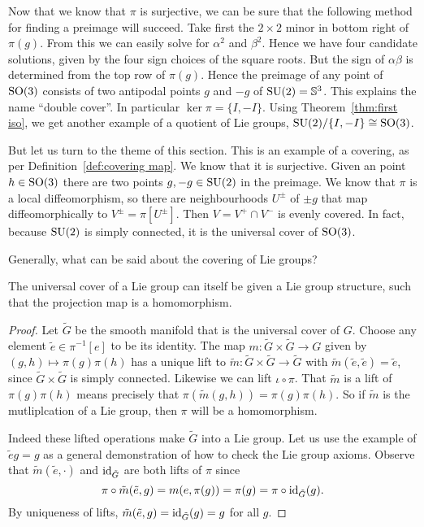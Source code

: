 Now that we know that $\pi$ is surjective, we can be sure that the following method for finding a preimage will succeed.
Take first the $2\times2$ minor in bottom right of $\pi(g)$.
From this we can easily solve for $\alpha^2$ and $\beta^2$.
Hence we have four candidate solutions, given by the four sign choices of the square roots.
But the sign of $\alpha\beta$ is determined from the top row of $\pi(g)$.
Hence the preimage of any point of $\mathrm{SO}(3)$ consists of two antipodal points $g$ and $-g$ of $\mathrm{SU}(2) = \mathbb{S}^3$.
This explains the name ``double cover''.
In particular $\ker \pi = \{I, -I\}$.
Using Theorem~\ref{thm:first iso}, we get another example of a quotient of Lie groups, $\mathrm{SU}(2)/\{I, -I\} \cong \mathrm{SO}(3)$.

But let us turn to the theme of this section. 
This is an example of a covering, as per Definition~\ref{def:covering map}.
We know that it is surjective.
Given an point $h \in \mathrm{SO}(3)$ there are two points $g,-g \in \mathrm{SU}(2)$ in the preimage.
We know that $\pi$ is a local diffeomorphism, so there are neighbourhoods $U^\pm$ of $\pm g$ that map diffeomorphically to $V^\pm = \pi[U^\pm]$.
Then $V = V^+ \cap V^-$ is evenly covered.
In fact, because $\mathrm{SU}(2)$ is simply connected, it is the universal cover of $\mathrm{SO}(3)$.

Generally, what can be said about the covering of Lie groups?
\begin{theorem}
The universal cover of a Lie group can itself be given a Lie group structure, such that the projection map is a homomorphism.
\end{theorem}
\begin{proof}
Let $\tilde{G}$ be the smooth manifold that is the universal cover of $G$.
Choose any element $\tilde{e} \in \pi^{-1}[e]$ to be its identity.
The map $m : \tilde{G}\times\tilde{G} \to G$ given by $(g,h) \mapsto \pi(g)\pi(h)$ has a unique lift to $\tilde{m} : \tilde{G}\times\tilde{G} \to \tilde{G}$ with $\tilde{m}(\tilde{e},\tilde{e}) = \tilde{e}$, since $\tilde{G}\times\tilde{G}$ is simply connected.
Likewise we can lift $\iota \circ \pi$.
That $\tilde{m}$ is a lift of $\pi(g)\pi(h)$ means precisely that $\pi(\tilde{m}(g,h)) = \pi(g)\pi(h)$.
So if $\tilde{m}$ is the mutliplcation of a Lie group, then $\pi$ will be a homomorphism.

Indeed these lifted operations make $\tilde{G}$ into a Lie group.
Let us use the example of $\tilde{e}g = g$ as a general demonstration of how to check the Lie group axioms.
Observe that $\tilde{m}(\tilde{e},\cdot)$ and $\operatorname{id}_{\tilde{G}}$ are both lifts of $\pi$ since
\[
\pi \circ \tilde{m}(\tilde{e},g) 
= m(e,\pi(g))
= \pi(g)
= \pi \circ \operatorname{id}_{\tilde{G}}(g).
\]
By uniqueness of lifts, $\tilde{m}(\tilde{e},g) = \operatorname{id}_{\tilde{G}}(g) = g$ for all $g$.
\end{proof}

